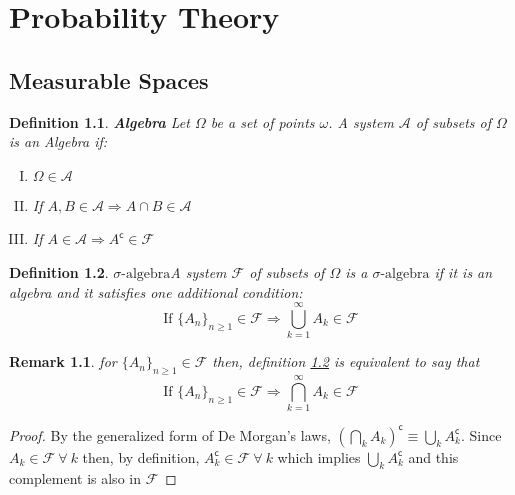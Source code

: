 \documentclass[11pt]{report}
\newcommand{\salg}{\sigma\text{-algebra}}
\begin{document}
\chapter{Probability Theory}

\section{Measurable Spaces}
\newtheorem{definition}{Definition}[chapter]
\newtheorem{remark}{Remark}[chapter]

\begin{definition}{\textbf{Algebra}}
	Let $\Omega$ be a set of points $\omega$. A system $\mathscr{A}$ of subsets of $\Omega$ is an Algebra if:
	\begin{enumerate}[I.]
		\item $\Omega \in \mathscr{A}$
		\item If $A, B \in \mathscr{A} \Rightarrow A \cap B \in \mathscr{A}$
		\item If $A \in \mathscr{A} \Rightarrow A^\mathsf{c} \in \mathscr{F}$
	\end{enumerate}
\end{definition}

\begin{definition}{\textbf{$\salg$}}\label{salgebra}
	A system $\mathscr{F}$ of subsets of $\Omega$ is a $\salg$ if it is an algebra and it satisfies one additional condition:
	\begin{equation*}
		\text{If } \{A_n\}_{n\geq 1} \in \mathscr{F} \Rightarrow \bigcup_{k=1}^{\infty} A_k \in \mathscr{F} 
	\end{equation*}
\end{definition}

\begin{remark}
	for $\{A_n\}_{n\geq 1} \in \mathscr{F}$ then, definition \ref{salgebra} is equivalent to say that
	\begin{equation*}
		\text{If } \{A_n\}_{n\geq 1} \in \mathscr{F} \Rightarrow \bigcap_{k=1}^{\infty} A_k \in \mathscr{F}
	\end{equation*}
\end{remark}

\begin{proof}
	By the generalized form of De Morgan's laws, $(\bigcap_k A_k)^\mathsf{c} \equiv \bigcup_k A_k^\mathsf{c}$. Since $A_k \in \mathscr{F} \ \forall \ k$ then, by definition,  $A_k^\mathsf{c} \in \mathscr{F} \ \forall \ k$ which implies  $\bigcup_k A_k^\mathsf{c}$ and this complement is also in $\mathscr{F}$
\end{proof}
\end{document}

